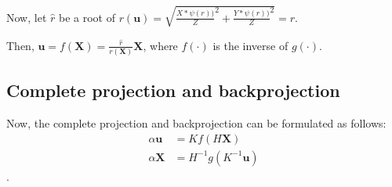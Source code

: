 Now, let \(\widehat{r}\) be a root of
\(r(\mathbf{u})
= \sqrt{
	\frac{X * \psi \left( r\right))}{Z}^{2} +
	\frac{Y * \psi \left( r\right))}{Z}^{2}
} = r\).

Then, \(\mathbf{u} = f(\mathbf{X}) =
\frac{\widehat{r}}{r(\mathbf{X})}\mathbf{X}\),
where \(f(\cdot)\) is the inverse of \(g(\cdot)\).

\subsection{Complete projection and backprojection}\label{sub:complete_projection_and_backprojection}

Now, the complete projection and backprojection can be formulated as follows:
\begin{align}
	\alpha \mathbf{u} & = K f(H\mathbf{X})
	\tag{Projection} \label{eq:projection}                              \\
	\alpha \mathbf{X} & = H^{-1} g(K^{-1}\mathbf{u}) \tag{Back
		projection} \label{eq:back_projection}
\end{align}.



